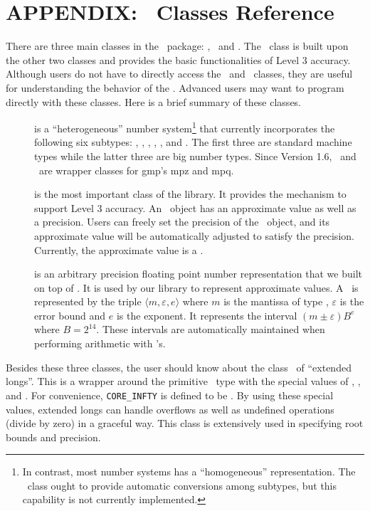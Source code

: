 
\newpage
\appendix
\section{APPENDIX: \core\ Classes Reference}
\label{classes}

There are three main classes in the \core\ package: \expr, \real\ and \BF.
The \expr\ class is built upon the other two classes and provides 
the basic functionalities of Level 3 accuracy.  Although users do not have 
to directly access the \real\ and \BF\ classes, they are useful for 
understanding the behavior of the \corelib.
Advanced users may want to program directly with these classes.
Here is a brief summary of these classes.

\begin{description}
\item[\real] is a ``heterogeneous'' number system\footnote{
In contrast, most number systems has a ``homogeneous'' representation.
The \real\ class ought to provide automatic conversions
among subtypes, but this capability is not
currently implemented.
} that currently incorporates the following six subtypes: 
\int, \lng, \double, \Int, \Rat, and \BF.
The first three are standard machine types while
the latter three are big number types.
Since Version 1.6, \Int\ and \Rat\ are wrapper classes
for gmp's mpz and mpq.

\item[\expr] is the most important class of the library.
It provides the mechanism to support Level 3 accuracy.
An \expr\ object has an approximate value as well as a precision.
Users can freely set the precision of the \expr\ object,
and its approximate value will be automatically adjusted to
satisfy the precision.  Currently, the approximate value is a \BF.

\item[\BF] is an arbitrary precision floating point number
representation that we built on top of \Int.  It is used by
our library to represent approximate values.  
A \BF\ is represented by the triple $\langle m, \varepsilon, e \rangle$
where $m$ is the mantissa of type \Int,
$\varepsilon$ is the error bound and $e$ is the exponent. 
It represents the interval $(m\pm \varepsilon)B^e$
where $B=2^{14}$.  These intervals
are automatically maintained when performing arithmetic with \BF's.
\end{description}

Besides these three classes, the user should know about the
class \extlong\ of ``extended longs''.
This is a wrapper around the primitive \lng\ type with
the special values of \posInfty, \negInfty, and \NaN.
For convenience, {\tt CORE\_INFTY} is defined to be \posInfty.
By using these special values,
extended longs can handle overflows as well
as undefined operations (divide by zero) in a graceful way.
This class is extensively used in specifying root bounds and precision.

